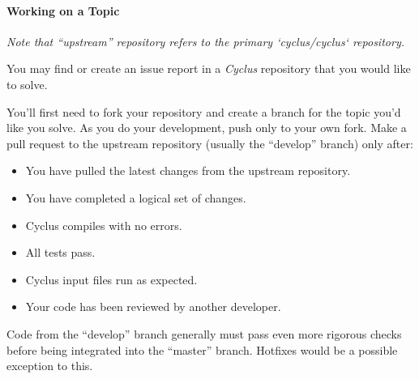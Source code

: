 \documentclass[letterpaper,10pt,english]{sphinxmanual}
\begin{document}
\paragraph{Working on a Topic}
\label{devdoc/contributing_to_cyclus:working-on-a-topic}
\emph{Note that ``upstream'' repository refers to the primary {}`cyclus/cyclus{}` repository.}

You may find or create an issue report in a \emph{Cyclus} repository that you would like
to solve.

You'll first need to fork your repository and create a branch for the topic you'd
like you solve. As you do your development, push only to your own fork. Make a
pull request to the upstream repository (usually the ``develop'' branch) only after:
\begin{itemize}
\item {} 
You have pulled the latest changes from the upstream repository.

\item {} 
You have completed a logical set of changes.

\item {} 
Cyclus compiles with no errors.

\item {} 
All tests pass.

\item {} 
Cyclus input files run as expected.

\item {} 
Your code has been reviewed by another developer.

\end{itemize}

Code from the ``develop'' branch generally must pass even more rigorous checks
before being integrated into the ``master'' branch. Hotfixes would be a
possible exception to this.
\end{document}
